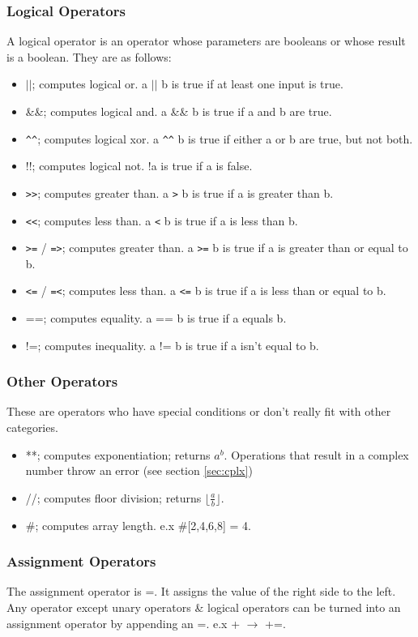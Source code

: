 \documentclass[12pt, letterpaper, oneside]{article}
\begin{document}
	\subsubsection{Logical Operators}
	A logical operator is an operator whose parameters are booleans or whose result is a boolean. They are as follows:
	\begin{itemize}
		\item[--] $\vert\vert$; computes logical or. a $\vert\vert$ b is true if at least one input is true.
		\item[--] \&\&; computes logical and. a \&\& b is true if a and b are true.
		\item[--] \verb|^^|; computes logical xor. a \verb|^^| b is true if either a or b are true, but not both.
		\item[--] !!; computes logical not. !a is true if a is false.
		\item[--] \verb|>>|; computes greater than. a \verb|>| b is true if a is greater than b.
		\item[--] \verb|<<|; computes less than. a \verb|<| b is true if a is less than b.
		\item[--] \verb|>=| / \verb|=>|; computes greater than. a \verb|>=| b is true if a is greater than or equal to b.
		\item[--] \verb|<=| / \verb|=<|; computes less than. a \verb|<=| b is true if a is less than or equal to b.
		\item[--] ==; computes equality. a == b is true if a equals b.
		\item[--] !=; computes inequality. a != b is true if a isn't equal to b.
	\end{itemize}
	\subsubsection{Other Operators}
	These are operators who have special conditions or don't really fit with other categories.
	\begin{itemize}
		\item[--] **; computes exponentiation; returns $a^b$. Operations that result in a complex number throw an error (see section \ref{sec:cplx})
		\item[--] //; computes floor division; returns $\lfloor \frac{a}{b} \rfloor$.
		\item[--] \#; computes array length. e.x \#[2,4,6,8] = 4.
	\end{itemize}
	\subsubsection{Assignment Operators}
	The assignment operator is =. It assigns the value of the right side to the left.
	Any operator except unary operators \& logical operators can be turned into an assignment operator by appending an =. e.x + $\rightarrow$ +=.
\end{document}
